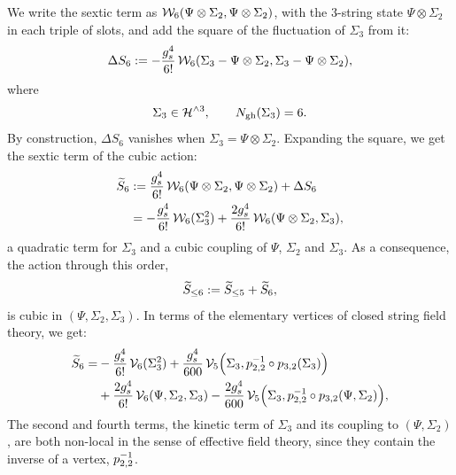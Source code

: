 We write the sextic term as $\dvertex{6}(\Psi \otimes \Sigma_2, \Psi \otimes \Sigma_2)$, with the $3$-string state $\Psi \otimes \Sigma_2$ in each triple of slots, and add the square of the fluctuation of $\Sigma_3$ from it:
\begin{equation}
  \label{p:eq:hs6:DeltaS6}
  \Delta S_6
    := - \frac{\gs^4}{6!} \, \dvertex{6}(\Sigma_3 - \Psi \otimes \Sigma_2, \Sigma_3 - \Psi \otimes \Sigma_2),
\end{equation}
where
\begin{equation}
  \Sigma_3 \in \Hn{3},
  \qquad
  \Ngh(\Sigma_3)
    = 6.
\end{equation}
By construction, $\Delta S_6$ vanishes when $\Sigma_3 = \Psi \otimes \Sigma_2$.
Expanding the square, we get the sextic term of the cubic action:
\begin{equation}
  \label{p:eq:hs6:S6tilde}
  \begin{aligned}
    \caction[6]
      &
      := \frac{\gs^4}{6!} \, \dvertex{6}(\Psi \otimes \Sigma_2, \Psi \otimes \Sigma_2) + \Delta S_6
      \\ &
      = - \frac{\gs^4}{6!} \, \dvertex{6}(\Sigma_3^2)
        + \frac{2 \gs^4}{6!} \, \dvertex{6}(\Psi \otimes \Sigma_2, \Sigma_3),
  \end{aligned}
\end{equation}
a quadratic term for $\Sigma_3$ and a cubic coupling of $\Psi$, $\Sigma_2$ and $\Sigma_3$.
As a consequence, the action through this order,
\begin{equation}
  \label{p:eq:hs6:action-tilde}
  \caction[\le 6]
    := \caction[\le 5] + \caction[6],
\end{equation}
is cubic in $(\Psi, \Sigma_2, \Sigma_3)$.
In terms of the elementary vertices of closed string field theory, we get:
\begin{equation}
  \label{p:eq:hs6:S6tilde-explicit}
  \begin{aligned}
    \caction[6]
      =
        &
        - \frac{\gs^4}{6!} \, \vertex{6}(\Sigma_3^2)
        + \frac{\gs^4}{600} \, \vertex{5}\Big( \Sigma_3, \sprod{2}{2}^{-1} \circ \sprod{3}{2}(\Sigma_3) \Big)
      \\ &
      + \frac{2 \gs^4}{6!} \, \vertex{6}(\Psi, \Sigma_2, \Sigma_3)
        - \frac{2 \gs^4}{600} \, \vertex{5}\Big( \Sigma_3, \sprod{2}{2}^{-1} \circ \sprod{3}{2}(\Psi, \Sigma_2) \Big),
  \end{aligned}
\end{equation}
The second and fourth terms, the kinetic term of $\Sigma_3$ and its coupling to $(\Psi, \Sigma_2)$, are both non-local in the sense of effective field theory, since they contain the inverse of a vertex, $\sprod{2}{2}^{-1}$.
